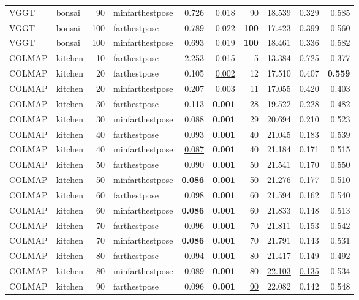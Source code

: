 \begin{table}[H]
\begin{tabular}{llrlrrrrrr}
VGGT & bonsai & 90 & minfarthestpose & 0.726 & 0.018 & \underline{90} & 18.539 & 0.329 & 0.585 \\
VGGT & bonsai & 100 & farthestpose & 0.789 & 0.022 & \textbf{100} & 17.423 & 0.399 & 0.560 \\
VGGT & bonsai & 100 & minfarthestpose & 0.693 & 0.019 & \textbf{100} & 18.461 & 0.336 & 0.582 \\
\midrule
COLMAP & kitchen & 10 & farthestpose & 2.253 & 0.015 & 5 & 13.384 & 0.725 & 0.377 \\
COLMAP & kitchen & 20 & farthestpose & 0.105 & \underline{0.002} & 12 & 17.510 & 0.407 & \textbf{0.559} \\
COLMAP & kitchen & 20 & minfarthestpose & 0.207 & 0.003 & 11 & 17.055 & 0.420 & 0.403 \\
COLMAP & kitchen & 30 & farthestpose & 0.113 & \textbf{0.001} & 28 & 19.522 & 0.228 & 0.482 \\
COLMAP & kitchen & 30 & minfarthestpose & 0.088 & \textbf{0.001} & 29 & 20.694 & 0.210 & 0.523 \\
COLMAP & kitchen & 40 & farthestpose & 0.093 & \textbf{0.001} & 40 & 21.045 & 0.183 & 0.539 \\
COLMAP & kitchen & 40 & minfarthestpose & \underline{0.087} & \textbf{0.001} & 40 & 21.184 & 0.171 & 0.515 \\
COLMAP & kitchen & 50 & farthestpose & 0.090 & \textbf{0.001} & 50 & 21.541 & 0.170 & 0.550 \\
COLMAP & kitchen & 50 & minfarthestpose & \textbf{0.086} & \textbf{0.001} & 50 & 21.276 & 0.177 & 0.510 \\
COLMAP & kitchen & 60 & farthestpose & 0.098 & \textbf{0.001} & 60 & 21.594 & 0.162 & 0.540 \\
COLMAP & kitchen & 60 & minfarthestpose & \textbf{0.086} & \textbf{0.001} & 60 & 21.833 & 0.148 & 0.513 \\
COLMAP & kitchen & 70 & farthestpose & 0.096 & \textbf{0.001} & 70 & 21.811 & 0.153 & 0.542 \\
COLMAP & kitchen & 70 & minfarthestpose & \textbf{0.086} & \textbf{0.001} & 70 & 21.791 & 0.143 & 0.531 \\
COLMAP & kitchen & 80 & farthestpose & 0.094 & \textbf{0.001} & 80 & 21.417 & 0.149 & 0.492 \\
COLMAP & kitchen & 80 & minfarthestpose & 0.089 & \textbf{0.001} & 80 & \underline{22.103} & \underline{0.135} & 0.534 \\
COLMAP & kitchen & 90 & farthestpose & 0.096 & \textbf{0.001} & \underline{90} & 22.082 & 0.142 & 0.548 \\

\end{tabular}
\end{table}
